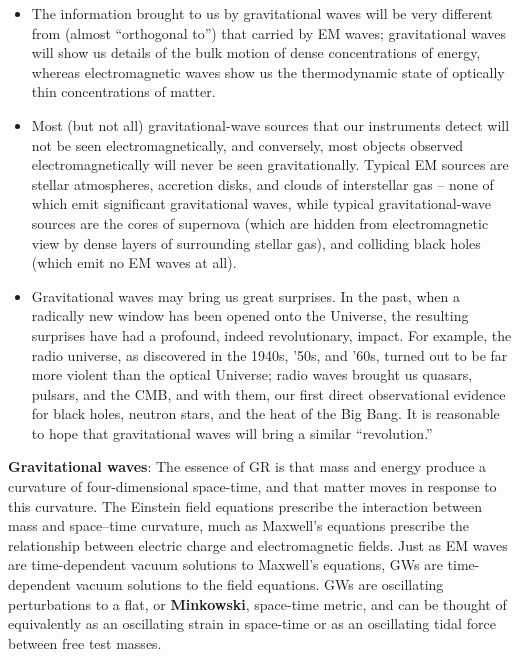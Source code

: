 \documentclass[a4paper,10pt]{article}
\begin{document}
\begin{itemize}
    \item The information brought to us by gravitational waves will be very different from (almost ``orthogonal to'') that carried by EM waves; gravitational waves will show us details of the bulk motion of dense concentrations of energy, whereas electromagnetic waves show us the thermodynamic state of optically thin concentrations of matter.
    \item Most (but not all) gravitational-wave sources that our instruments detect will not be seen electromagnetically, and conversely, most objects observed electromagnetically will never be seen gravitationally. Typical EM sources are stellar atmospheres, accretion disks, and clouds of interstellar gas -- none of which emit significant gravitational waves, while typical gravitational-wave sources are the cores of supernova (which are hidden from electromagnetic view by dense layers of surrounding stellar gas), and colliding black holes (which emit no EM waves at all).
    \item Gravitational waves may bring us great surprises. In the past, when a radically new window has been opened onto the Universe, the resulting surprises have had a profound, indeed revolutionary, impact. For example, the radio universe, as discovered in the 1940s, '50s, and '60s, turned out to be far more violent than the optical Universe; radio waves brought us quasars, pulsars, and the CMB, and with them, our first direct observational evidence for black holes, neutron stars, and the heat of the Big Bang. It is reasonable to hope that gravitational waves will bring a similar ``revolution.''
\end{itemize}

{\noindent}\textbf{Gravitational waves}: The essence of GR is that mass and energy produce a curvature of four-dimensional space-time, and that matter moves in response to this curvature. The Einstein field equations prescribe the interaction between mass and space–time curvature, much as Maxwell's equations prescribe the relationship between electric charge and electromagnetic fields. Just as EM waves are time-dependent vacuum solutions to Maxwell's equations, GWs are time-dependent vacuum solutions to the field equations. GWs are oscillating perturbations to a flat, or \textbf{Minkowski}, space-time metric, and can be thought of equivalently as an oscillating strain in space-time or as an oscillating tidal force between free test masses.
\end{document}
